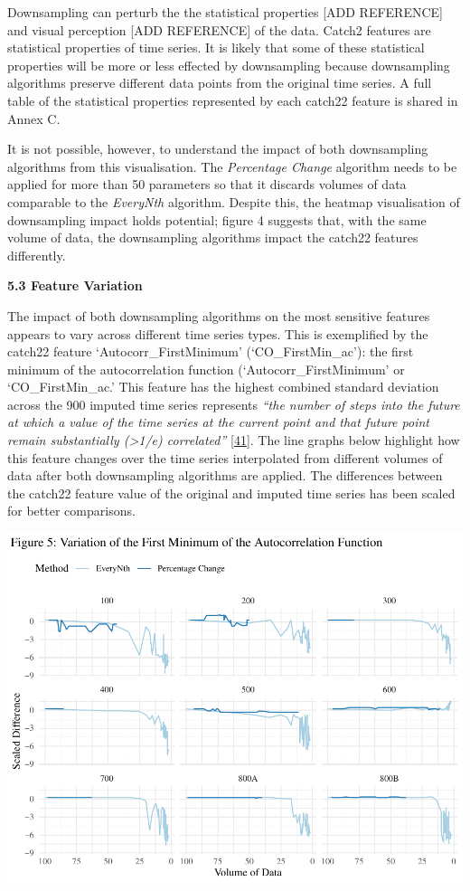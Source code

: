 \documentclass{article}
\begin{document}
Downsampling can perturb the the statistical properties {[}ADD
REFERENCE{]} and visual perception {[}ADD REFERENCE{]} of the data.
Catch2 features are statistical properties of time series. It is likely
that some of these statistical properties will be more or less effected
by downsampling because downsampling algorithms preserve different data
points from the original time series. A full table of the statistical
properties represented by each catch22 feature is shared in Annex C.

It is not possible, however, to understand the impact of both
downsampling algorithms from this visualisation. The \emph{Percentage
Change} algorithm needs to be applied for more than 50 parameters so
that it discards volumes of data comparable to the \emph{EveryNth}
algorithm. Despite this, the heatmap visualisation of downsampling
impact holds potential; figure 4 suggests that, with the same volume of
data, the downsampling algorithms impact the catch22 features
differently.

\newpage

\textbf{5.3 Feature Variation}

The impact of both downsampling algorithms on the most sensitive
features appears to vary across different time series types. This is
exemplified by the catch22 feature `Autocorr\_FirstMinimum'
(`CO\_FirstMin\_ac'): the first minimum of the autocorrelation function
(`Autocorr\_FirstMinimum' or `CO\_FirstMin\_ac.' This feature has the
highest combined standard deviation across the 900 imputed time series
represents \emph{``the number of steps into the future at which a value
of the time series at the current point and that future point remain
substantially (\textgreater1/e) correlated''}
\protect\hyperlink{ref-feature_book}{{[}41{]}}. The line graphs below
highlight how this feature changes over the time series interpolated
from different volumes of data after both downsampling algorithms are
applied. The differences between the catch22 feature value of the
original and imputed time series has been scaled for better comparisons.

\includegraphics{210431461_CSC8639_Dissertation_files/figure-latex/FirstMinimum-1.pdf}
\end{document}
